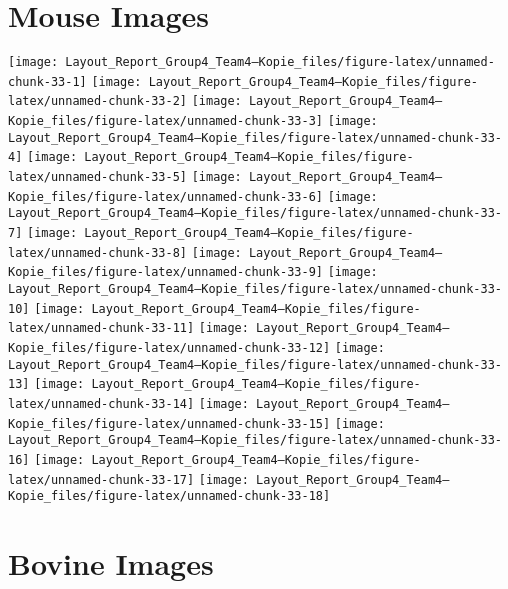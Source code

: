 \documentclass[
  parskip,
  oneside]{scrreprt}
\begin{document}
\hypertarget{mouse-images}{%
\section{Mouse Images}\label{mouse-images}}

\texttt{[image: Layout\_Report\_Group4\_Team4---Kopie\_files/figure-latex/unnamed-chunk-33-1]}
\texttt{[image: Layout\_Report\_Group4\_Team4---Kopie\_files/figure-latex/unnamed-chunk-33-2]}
\texttt{[image: Layout\_Report\_Group4\_Team4---Kopie\_files/figure-latex/unnamed-chunk-33-3]}
\texttt{[image: Layout\_Report\_Group4\_Team4---Kopie\_files/figure-latex/unnamed-chunk-33-4]}
\texttt{[image: Layout\_Report\_Group4\_Team4---Kopie\_files/figure-latex/unnamed-chunk-33-5]}
\texttt{[image: Layout\_Report\_Group4\_Team4---Kopie\_files/figure-latex/unnamed-chunk-33-6]}
\texttt{[image: Layout\_Report\_Group4\_Team4---Kopie\_files/figure-latex/unnamed-chunk-33-7]}
\texttt{[image: Layout\_Report\_Group4\_Team4---Kopie\_files/figure-latex/unnamed-chunk-33-8]}
\texttt{[image: Layout\_Report\_Group4\_Team4---Kopie\_files/figure-latex/unnamed-chunk-33-9]}
\texttt{[image: Layout\_Report\_Group4\_Team4---Kopie\_files/figure-latex/unnamed-chunk-33-10]}
\texttt{[image: Layout\_Report\_Group4\_Team4---Kopie\_files/figure-latex/unnamed-chunk-33-11]}
\texttt{[image: Layout\_Report\_Group4\_Team4---Kopie\_files/figure-latex/unnamed-chunk-33-12]}
\texttt{[image: Layout\_Report\_Group4\_Team4---Kopie\_files/figure-latex/unnamed-chunk-33-13]}
\texttt{[image: Layout\_Report\_Group4\_Team4---Kopie\_files/figure-latex/unnamed-chunk-33-14]}
\texttt{[image: Layout\_Report\_Group4\_Team4---Kopie\_files/figure-latex/unnamed-chunk-33-15]}
\texttt{[image: Layout\_Report\_Group4\_Team4---Kopie\_files/figure-latex/unnamed-chunk-33-16]}
\texttt{[image: Layout\_Report\_Group4\_Team4---Kopie\_files/figure-latex/unnamed-chunk-33-17]}
\texttt{[image: Layout\_Report\_Group4\_Team4---Kopie\_files/figure-latex/unnamed-chunk-33-18]}

\hypertarget{bovine-images}{%
\section{Bovine Images}\label{bovine-images}}
\end{document}
